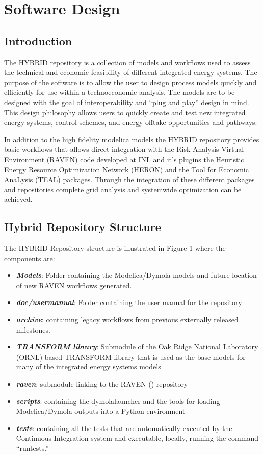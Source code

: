 \section{Software Design}
\subsection{Introduction}
The HYBRID repository is a collection of models and workflows used to assess the technical and economic feasibility of different integrated energy systems. The purpose of the software is to allow the user to design process models quickly and efficiently for use within a technoeconomic analysis. The models are to be designed with the goal of interoperability and “plug and play” design in mind. This design philosophy allows users to quickly create and test new integrated energy systems, control schemes, and energy offtake opportunities and pathways. 

In addition to the high fidelity modelica models the HYBRID repository provides basic workflows that allows direct integration with the Risk Analysis Virtual Environment (RAVEN) code developed at INL and it’s plugins the Heuristic Energy Resource Optimization Network (HERON) and the Tool for Economic AnaLysis (TEAL) packages. Through the integration of these different packages and repositories complete grid analysis and systemwide optimization can be achieved. 

\subsection{Hybrid Repository Structure}
The HYBRID Repository structure is illustrated in Figure 1 where the components are:

\begin{itemize}
\item \textbf{\textit{Models}}: Folder containing the Modelica/Dymola models and future location of new RAVEN workflows generated.
\item \textbf{\textit{doc/user\textunderscore manual}}: Folder containing the user manual for the repository
\item \textbf{\textit{archive}}: containing legacy workflows from previous externally released milestones.
\item \textbf{\textit{TRANSFORM library}}: Submodule of the Oak Ridge National Laboratory (ORNL) based TRANSFORM library that is used as the base models for many of the integrated energy systems models
\item \textbf{\textit{raven}}: submodule linking to the RAVEN (\cite{RAVENuserManual}) repository
\item \textbf{\textit{scripts}}: containing the dymola\textunderscore launcher and the tools for loading Modelica/Dymola outputs into a Python environment
\item \textbf{\textit{tests}}: containing all the tests that are automatically executed by the Continuous Integration system and executable, locally, running the command “run\textunderscore tests.”
\end{itemize}

